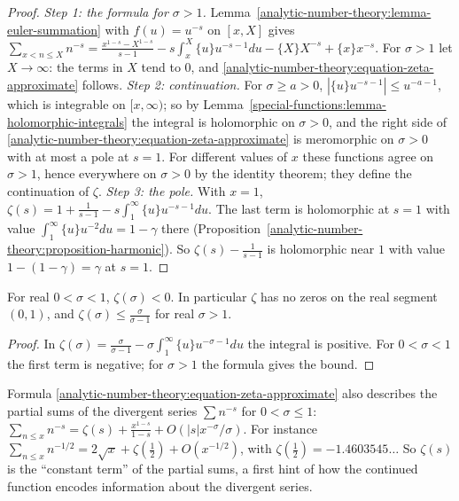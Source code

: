 \begin{proof}
\emph{Step 1: the formula for $\sigma > 1$.} Lemma~\ref{analytic-number-theory:lemma-euler-summation} with $f(u) = u^{-s}$ on $[x, X]$ gives
$\sum_{x < n \leq X}n^{-s} = \frac{x^{1-s} - X^{1-s}}{s - 1} - s\int_x^X\{u\}u^{-s-1}du - \{X\}X^{-s} + \{x\}x^{-s}$. For $\sigma > 1$ let $X \to \infty$: the terms in $X$ tend to $0$, and
\eqref{analytic-number-theory:equation-zeta-approximate} follows.
\emph{Step 2: continuation.} For $\sigma \geq a > 0$, $|\{u\}u^{-s-1}| \leq u^{-a-1}$, which is integrable on $[x, \infty)$; so by Lemma~\ref{special-functions:lemma-holomorphic-integrals} the
integral is holomorphic on $\sigma > 0$, and the right side of \eqref{analytic-number-theory:equation-zeta-approximate} is meromorphic on $\sigma > 0$ with at most a pole at $s = 1$. For different values of
$x$ these functions agree on $\sigma > 1$, hence everywhere on $\sigma > 0$ by the identity theorem; they define the continuation of $\zeta$.
\emph{Step 3: the pole.} With $x = 1$, $\zeta(s) = 1 + \frac{1}{s - 1} - s\int_1^\infty\{u\}u^{-s-1}du$. The last term is holomorphic at $s = 1$ with value $\int_1^\infty\{u\}u^{-2}du = 1 - \gamma$ there
(Proposition~\ref{analytic-number-theory:proposition-harmonic}). So $\zeta(s) - \frac{1}{s - 1}$ is holomorphic near $1$ with value $1 - (1 - \gamma) = \gamma$ at $s = 1$.
\end{proof}

\begin{corollary}\label{analytic-number-theory:corollary-zeta-negative-real}
For real $0 < \sigma < 1$, $\zeta(\sigma) < 0$. In particular $\zeta$ has no zeros on the real segment $(0, 1)$, and $\zeta(\sigma) \leq \frac{\sigma}{\sigma - 1}$ for real $\sigma > 1$.
\end{corollary}

\begin{proof}
In $\zeta(\sigma) = \frac{\sigma}{\sigma - 1} - \sigma\int_1^\infty\{u\}u^{-\sigma-1}du$ the integral is positive. For $0 < \sigma < 1$ the first term is negative; for $\sigma > 1$ the formula gives the bound.
\end{proof}

\begin{remark}\label{analytic-number-theory:remark-zeta-partial-sums}
Formula \eqref{analytic-number-theory:equation-zeta-approximate} also describes the partial sums of the divergent series $\sum n^{-s}$ for $0 < \sigma \leq 1$:
$\sum_{n \leq x}n^{-s} = \zeta(s) + \frac{x^{1-s}}{1 - s} + O(|s|x^{-\sigma}/\sigma)$. For instance $\sum_{n \leq x}n^{-1/2} = 2\sqrt{x} + \zeta(\frac12) + O(x^{-1/2})$, with
$\zeta(\frac12) = -1.4603545\ldots$ So $\zeta(s)$ is the ``constant term'' of the partial sums, a first hint of how the continued function encodes information about the divergent series.
\end{remark}


